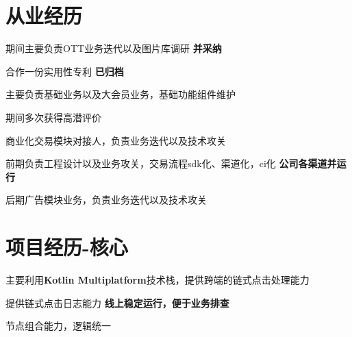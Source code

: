 \documentclass[]{deedy-resume-openfont}
\begin{document}
\begin{minipage}[t]{0.73\textwidth} 


\section{从业经历}
\sectionsep
{}
\vspace{0.2em}
\vspace{\topsep}
\begin{tightemize}
    \item 期间主要负责OTT业务迭代以及图片库调研 \textbf{并采纳}
    \item 合作一份实用性专利 \textbf{已归档}
\end{tightemize}
\sectionsep

\vspace{0.2em}
\begin{tightemize}
    \item 主要负责基础业务以及大会员业务，基础功能组件维护
    \item 期间多次获得高潜评价
\end{tightemize}
\sectionsep

\vspace{0.2em}
\begin{tightemize}
    \item 商业化交易模块对接人，负责业务迭代以及技术攻关
    \item 前期负责工程设计以及业务攻关，交易流程sdk化、渠道化，ci化 \textbf{公司各渠道并运行}
    \item 后期广告模块业务，负责业务迭代以及技术攻关
\end{tightemize}
\sectionsep


\section{项目经历-核心}
\sectionsep
{}
\vspace{0.2em}
\begin{tightemize}
    \item 主要利用\textbf{Kotlin Multiplatform}技术栈，提供跨端的链式点击处理能力
    \item 提供链式点击日志能力 \textbf{线上稳定运行，便于业务排查}
    \item 节点组合能力，逻辑统一
    \end{tightemize}
\sectionsep


\end{minipage}
\end{document}
